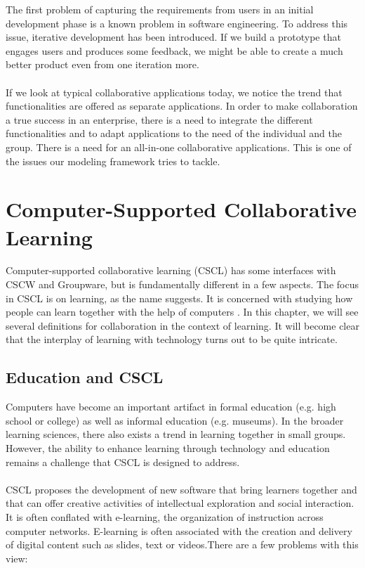 The first problem of capturing the requirements from users in an initial development phase is a known problem in software engineering. To address this issue, iterative development has been introduced. If we build a prototype that engages users and produces some feedback, we might be able to create a much better product even from one iteration more.
\\ \\
If we look at typical collaborative applications today, we notice the trend that functionalities are offered as separate applications. In order to make collaboration a true success in an enterprise, there is a need to integrate the different functionalities and to adapt applications to the need of the individual and the group. There is a need for an all-in-one collaborative applications. This is one of the issues our modeling framework tries to tackle. 

\section{Computer-Supported Collaborative Learning}

Computer-supported collaborative learning (CSCL) has some interfaces with CSCW and Groupware, but is fundamentally different in a few aspects. The focus in CSCL is on learning, as the name suggests. It is concerned with studying how people can learn together with the help of computers \cite{CSCLHistory}. In this chapter, we will see several definitions for collaboration in the context of learning. It will become clear that the interplay of learning with technology turns out to be quite intricate. 

\subsection{Education and CSCL}

Computers have become an important artifact in formal education (e.g. high school or college) as well as informal education (e.g. museums). In the broader learning sciences, there also exists a trend in learning together in small groups. However, the ability to enhance learning through technology and education remains a challenge that CSCL is designed to address. 
\\ \\
CSCL proposes the development of new software that bring learners together and that can offer creative activities of intellectual exploration and social interaction. It is often conflated with e-learning, the organization of instruction across computer networks. E-learning is often associated with the creation and delivery of digital content such as slides, text or videos.There are a few problems with this view:

